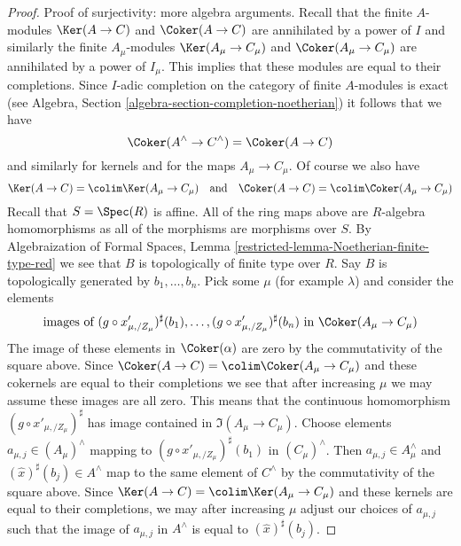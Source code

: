 \begin{proof}
\medskip\noindent
Proof of surjectivity: more algebra arguments. Recall that the finite
$A$-modules $\Ker(A \to C)$ and $\Coker(A \to C)$ are annihilated
by a power of $I$ and similarly the finite $A_\mu$-modules
$\Ker(A_\mu \to C_\mu)$ and $\Coker(A_\mu \to C_\mu)$ are annihilated
by a power of $I_\mu$. This implies that these modules are
equal to their completions. Since $I$-adic completion on the category of
finite $A$-modules is exact (see
Algebra, Section \ref{algebra-section-completion-noetherian})
it follows that we have
$$
\Coker(A^\wedge \to C^\wedge) = \Coker(A \to C)
$$
and similarly for kernels and for the maps $A_\mu \to C_\mu$.
Of course we also have
$$
\Ker(A \to C) = \colim \Ker(A_\mu \to C_\mu)
\quad\text{and}\quad
\Coker(A \to C) = \colim \Coker(A_\mu \to C_\mu)
$$
Recall that $S = \Spec(R)$ is affine. All of the ring maps
above are $R$-algebra homomorphisms as all of the morphisms
are morphisms over $S$. By
Algebraization of Formal Spaces, Lemma
\ref{restricted-lemma-Noetherian-finite-type-red}
we see that $B$ is topologically of finite type over $R$.
Say $B$ is topologically generated by $b_1, \ldots, b_n$.
Pick some $\mu$ (for example $\lambda$) and consider
the elements
$$
\text{images of }
(g \circ x'_{\mu, /Z_\mu})^\sharp(b_1)
, \ldots,
(g \circ x'_{\mu, /Z_\mu})^\sharp(b_n)
\text{ in }\Coker(A_\mu \to C_\mu)
$$
The image of these elements in $\Coker(\alpha)$ are zero
by the commutativity of the square above. Since
$\Coker(A \to C) = \colim \Coker(A_\mu \to C_\mu)$ and these
cokernels are equal to their completions
we see that after increasing $\mu$ we may assume these
images are all zero. This means that the continuous
homomorphism $(g \circ x'_{\mu, /Z_\mu})^\sharp$ has image contained
in $\Im(A_\mu \to C_\mu)$.
Choose elements $a_{\mu, j} \in (A_\mu)^\wedge$ mapping to
$(g \circ x'_{\mu, /Z_\mu})^\sharp(b_1)$ in $(C_\mu)^\wedge$.
Then $a_{\mu, j} \in A_\mu^\wedge$ and $(\hat x)^\sharp(b_j) \in A^\wedge$
map to the same element of $C^\wedge$ by the commutativity of the
square above. Since
$\Ker(A \to C) = \colim \Ker(A_\mu \to C_\mu)$ and these kernels
are equal to their completions, we may after increasing
$\mu$ adjust our choices of $a_{\mu, j}$ such that
the image of $a_{\mu, j}$ in $A^\wedge$ is equal to $(\hat x)^\sharp(b_j)$.


\end{proof}
